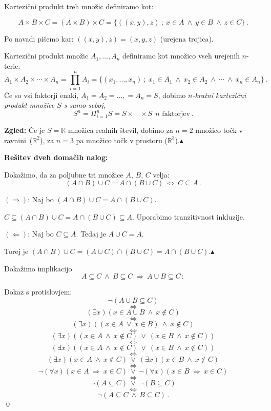 \documentclass[11pt,paper=b5,footinclude,headinclude]{scrbook} %
\def\ali {{~\vee~}}
\def\inn {{~\wedge~}}
\def\sledi {{~\Rightarrow~}}
\def\cee {{~\Leftrightarrow~}}
\def\zgled{\noindent\textbf{\color{blue} Zgled: }}
\def\kz{{\hfill{\color{blue}$\blacktriangle$}}}%
\begin{document}
Kartezični produkt treh množic definiramo kot:

$$A\times B\times C = (A\times B)\times C= \{((x,y),z)~;~x\in A \inn y\in B\inn z\in C\}\,.$$

Po navadi pišemo kar: $((x,y),z) = (x,y,z)$ (urejena trojica).

\bigskip
Kartezični produkt množic $A_1,\ldots, A_n$ definiramo kot
množico vseh urejenih $n$-teric:
$$A_1\times A_2\times\cdots \times A_n = \prod_{i = 1}^n A_i = \{(x_1,\ldots, x_n)~;~x_1\in A_1\inn x_2\in A_2\inn\cdots \inn x_n\in A_n\}\,.$$
Če so vsi faktorji enaki, $A_1 = A_2 = \ldots,  = A_n = S$, dobimo {\em $n$-kratni kartezični produkt množice $S$ s samo seboj},
$$S^n = \Pi_{i = 1}^nS = S\times\cdots\times S~~\textrm{$n$ faktorjev}\,.$$

\zgled
Če je $S = \mathbb{R}$ množica realnih števil,
dobimo za $n = 2$ množico točk v ravnini~($\mathbb{R}^2$), za
$n = 3$ pa množico točk v prostoru ($\mathbb{R}^3$).\kz

\bigskip

%
%
\bigskip
\textbf{ Rešitev dveh domačih nalog:}

Dokažimo, da za poljubne tri množice $A$, $B$, $C$ velja:
$$(A\cap B)\cup C = A\cap (B\cup C) \cee C\subseteq A\,.$$

\medskip
$(\Rightarrow)$:
Naj bo $(A\cap B)\cup C = A\cap (B\cup C)$.

$C\subseteq (A\cap B)\cup C = A\cap (B\cup C)\subseteq A$. Uporabimo tranzitivnost inkluzije.

\medskip
$(\Leftarrow)$:
Naj bo $C\subseteq A$. Tedaj je $A\cup C = A$.

Torej je
$(A\cap B)\cup C = (A\cup C)\cap (B\cup C) = A\cap (B\cup C)$.\kz

\bigskip
Dokažimo implikacijo
$$A\subseteq C\inn B\subseteq C\sledi A\cup B \subseteq C\,:$$

Dokaz s protislovjem:
$$\neg(A\cup B\subseteq C)$$
$$\cee$$
$$(\exists x)(x\in A\cup B\inn x\not\in C)$$
$$\cee$$
$$(\exists x)((x\in A \ali x\in B)\inn x\not\in C)$$
$$\cee$$
$$(\exists x)((x\in A \inn x\not\in C) \ali (x\in B\inn x\not\in C))$$
$$\cee$$
$$(\exists x)((x\in A \inn x\not\in C) \ali (x\in B\inn x\not\in C))$$
$$\cee$$
$$(\exists x)(x\in A \inn x\not\in C) \ali (\exists x)(x\in B\inn x\not\in C)$$
$$\cee$$
$$\neg(\forall x)(x\in A\sledi x\in C)\ali\neg(\forall x)(x\in B\sledi x\in C)$$
$$\cee$$
$$\neg(A \subseteq C) \ali \neg(B\subseteq C)$$
$$\cee$$
$$\neg(A \subseteq C \inn B\subseteq C)\,.$$
\qed
\end{document}
